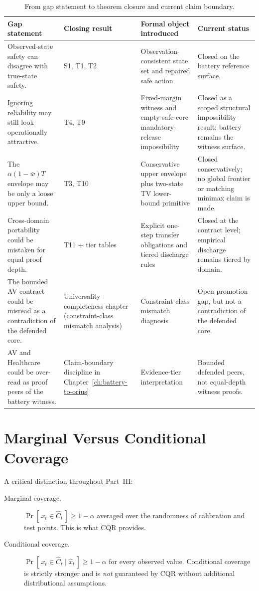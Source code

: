 \begin{table}[htbp]
\centering
\caption{From gap statement to theorem closure and current claim boundary.}
\label{tab:gap-closure-map}
\begin{tabular}{p{3.0cm}p{2.3cm}p{3.1cm}p{3.6cm}}
\toprule
\textbf{Gap statement} & \textbf{Closing result} & \textbf{Formal object introduced} & \textbf{Current status} \\
\midrule
Observed-state safety can disagree with true-state safety. & S1, T1, T2 & Observation-consistent state set and repaired safe action & Closed on the battery reference surface. \\
\addlinespace
Ignoring reliability may still look operationally attractive. & T4, T9 & Fixed-margin witness and empty-safe-core mandatory-release impossibility & Closed as a scoped structural impossibility result; battery remains the witness surface. \\
\addlinespace
The $\alpha(1-\bar{w})T$ envelope may be only a loose upper bound. & T3, T10 & Conservative upper envelope plus two-state TV lower-bound primitive & Closed conservatively; no global frontier or matching minimax claim is made. \\
\addlinespace
Cross-domain portability could be mistaken for equal proof depth. & T11 + tier tables & Explicit one-step transfer obligations and tiered discharge rules & Closed at the contract level; empirical discharge remains tiered by domain. \\
\addlinespace
The bounded AV contract could be misread as a contradiction of the defended core. & Universality-completeness chapter (constraint-class mismatch analysis) & Constraint-class mismatch diagnosis & Open promotion gap, but not a contradiction of the defended core. \\
\addlinespace
AV and Healthcare could be over-read as proof peers of the battery witness. & Claim-boundary discipline in Chapter~\ref{ch:battery-to-orius} & Evidence-tier interpretation & Bounded defended peers, not equal-depth witness proofs. \\
\bottomrule
\end{tabular}
\end{table}

\section{Marginal Versus Conditional Coverage}

A critical distinction throughout Part~III:
\begin{description}
  \item[Marginal coverage.] $\Pr[\,x_t \in \hat{C}_t\,] \ge 1 - \alpha$
    averaged over the randomness of calibration and test points.
    This is what CQR provides.
  \item[Conditional coverage.] $\Pr[\,x_t \in \hat{C}_t \mid \hat{x}_t\,]
    \ge 1 - \alpha$ for every observed value.  Conditional coverage is
    strictly stronger and is \emph{not} guaranteed by CQR without
    additional distributional assumptions.
\end{description}


